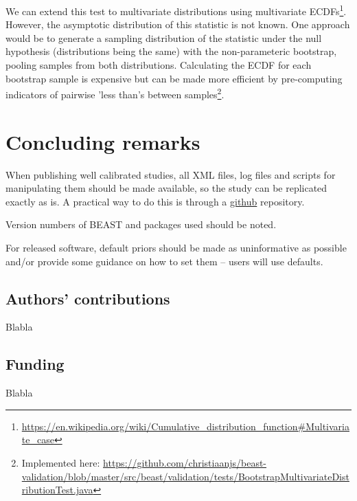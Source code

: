 \documentclass[oneside]{article}
\begin{document}
We can extend this test to multivariate distributions using multivariate ECDFs\footnote{\url{https://en.wikipedia.org/wiki/Cumulative_distribution_function\#Multivariate_case}}. However, the asymptotic distribution of this statistic is not known. One approach would be to generate a sampling distribution of the statistic under the null hypothesis (distributions being the same) with the non-parameteric bootstrap, pooling samples from both distributions. Calculating the ECDF for each bootstrap sample is expensive but can be made more efficient by pre-computing indicators of pairwise 'less than's between samples\footnote{Implemented here: \url{https://github.com/christiaanjs/beast-validation/blob/master/src/beast/validation/tests/BootstrapMultivariateDistributionTest.java}}.

\section*{Concluding remarks}

When publishing well calibrated studies, all XML files, log files and
scripts for manipulating them should be made available, so the study can
be replicated exactly as is. A practical way to do this is through a
\href{http://github.com}{github} repository.

Version numbers of BEAST and packages used should be noted.

For released software, default priors should be made as uninformative as 
possible and/or provide some guidance on how to set them -- users will use defaults.


\subsection*{Authors' contributions}
Blabla

\subsection*{Funding}
Blabla







\end{document}
